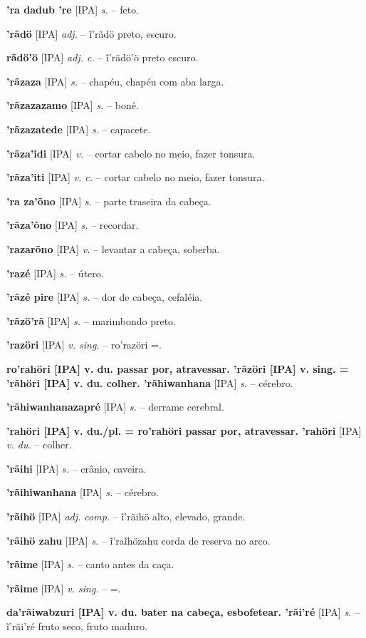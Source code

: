 \textbf{'ra dadub 're} [IPA] \textit{s.} -- feto.

\textbf{'rãdö} [IPA] \textit{adj.} -- ĩ'rãdö preto, escuro.

\textbf{rãdö'ö} [IPA] \textit{adj. c.} -- ĩ'rãdö'ö preto escuro.

\textbf{'rãzaza} [IPA] \textit{s.} -- chapéu, chapéu com aba larga.

\textbf{'rãzazazamo} [IPA] \textit{s.} -- boné.

\textbf{'rãzazatede} [IPA] \textit{s.} -- capacete.

\textbf{'rãza'idi} [IPA] \textit{v.} -- cortar cabelo no meio, fazer tonsura.

\textbf{'rãza'iti} [IPA] \textit{v. c.} -- cortar cabelo no meio, fazer tonsura.

\textbf{'ra za'õno} [IPA] \textit{s.} -- parte traseira da cabeça.

\textbf{'rãza'õno} [IPA] \textit{s.} -- recordar.

\textbf{'razarõno} [IPA] \textit{v.} -- levantar a cabeça, soberba.

\textbf{'razé} [IPA] \textit{s.} -- útero.

\textbf{'rãzé pire} [IPA] \textit{s.} -- dor de cabeça, cefaléia.

\textbf{'rãzö'rã} [IPA] \textit{s.} -- marimbondo preto.

\textbf{'razöri} [IPA] \textit{v. sing.} -- ro'razöri =.

\textbf{ro'rahöri [IPA] v. du. passar por, atravessar. 'rãzöri [IPA] v. sing. = 'rãhöri [IPA] v. du. colher. 'rãhiwanhana} [IPA] \textit{s.} -- cérebro.

\textbf{'rãhiwanhanazapré} [IPA] \textit{s.} -- derrame cerebral.

\textbf{'rahöri [IPA] v. du./pl. = ro'rahöri passar por, atravessar. 'rahöri} [IPA] \textit{v. du.} -- colher.

\textbf{'rãihi} [IPA] \textit{s.} -- crânio, caveira.

\textbf{'rãihiwanhana} [IPA] \textit{s.} -- cérebro.

\textbf{'rãihö} [IPA] \textit{adj. comp.} -- ĩ'rãihö alto, elevado, grande.

\textbf{'rãihö zahu} [IPA] \textit{s.} -- ĩ'raĩhözahu corda de reserva no arco.

\textbf{'rãime} [IPA] \textit{s.} -- canto antes da caça.

\textbf{'rãime} [IPA] \textit{v. sing.} -- =.

\textbf{da'rãiwabzuri [IPA] v. du. bater na cabeça, esbofetear. 'rãi'ré} [IPA] \textit{s.} -- ĩ'rãi'ré fruto seco, fruto maduro.

